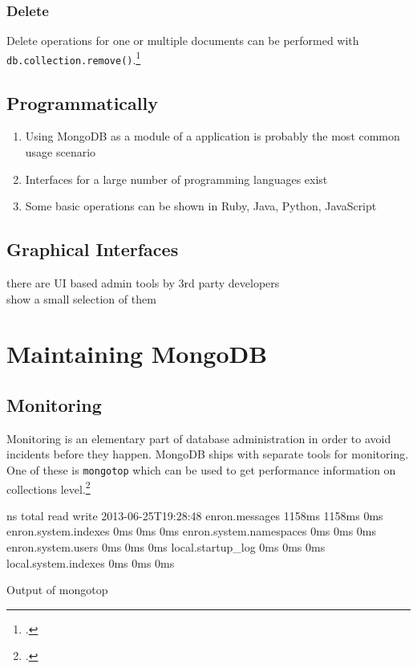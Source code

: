 \subsubsection{Delete}
Delete operations for one or multiple documents can be performed with
\texttt{db.collection.remove()}.\footcite[Cf.][p. 83 et.
sqq.]{mongo_crud_manual}


\subsection{Programmatically}
\label{sec:usage-programmatically}
\begin{enumerate}
  \item Using MongoDB as a module of a application is probably the most common usage scenario
  \item Interfaces for a large number of programming languages exist
  \item Some basic operations can be shown in Ruby, Java, Python, JavaScript
\end{enumerate}


\subsection{Graphical Interfaces}
\label{sec:usage-gui}
there are UI based admin tools by 3rd party developers\\
show a small selection of them

\newpage
\section{Maintaining MongoDB}
\label{sec:maintenance}

\subsection{Monitoring}
\label{sec:maintenance-monitroing}
Monitoring is an elementary part of database administration in order to avoid
incidents before they happen. MongoDB ships with separate tools for monitoring.
One of these is \texttt{mongotop} which can be used to get performance information
on collections level.\footcite[Cf.][]{mongo_monitoring}
\begin{listing}
    \begin{bashcode}
                            ns       total        read       write
2013-06-25T19:28:48
                enron.messages      1158ms      1158ms         0ms
          enron.system.indexes         0ms         0ms         0ms
       enron.system.namespaces         0ms         0ms         0ms
            enron.system.users         0ms         0ms         0ms
             local.startup_log         0ms         0ms         0ms
          local.system.indexes         0ms         0ms         0ms
    \end{bashcode}
    \caption{Output of mongotop}
    \label{lst:mongotop}
\end{listing}

